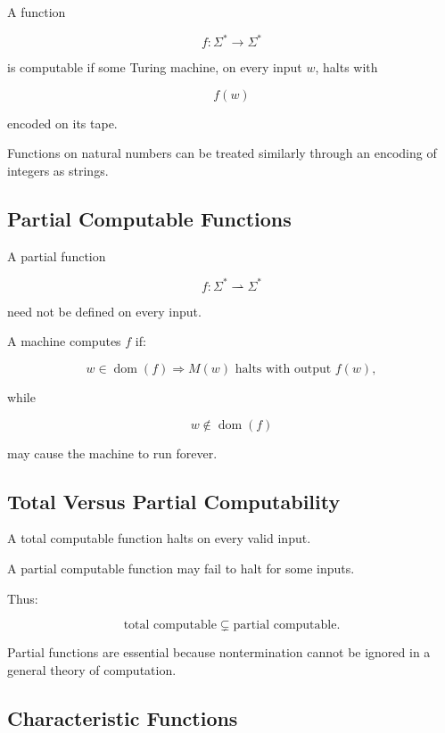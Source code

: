 A function

\[
f:\Sigma^*\to\Sigma^*
\]

is computable if some Turing machine, on every input \(w\), halts with

\[
\boxed{
f(w)
}
\]

encoded on its tape.

Functions on natural numbers can be treated similarly through an encoding
of integers as strings.

\subsection{Partial Computable Functions}
\label{subsec:partial-computable-functions}

A partial function

\[
f:\Sigma^*
\rightharpoonup
\Sigma^*
\]

need not be defined on every input.

A machine computes \(f\) if:

\[
w\in\operatorname{dom}(f)
\Longrightarrow
M(w)
\text{ halts with output }f(w),
\]

while

\[
w\notin\operatorname{dom}(f)
\]

may cause the machine to run forever.

\subsection{Total Versus Partial Computability}
\label{subsec:total-partial-computability}

A total computable function halts on every valid input.

A partial computable function may fail to halt for some inputs.

Thus:

\[
\boxed{
\text{total computable}
\subsetneq
\text{partial computable}.
}
\]

Partial functions are essential because nontermination cannot be ignored in
a general theory of computation.

\subsection{Characteristic Functions}
\label{subsec:characteristic-functions-computability}


